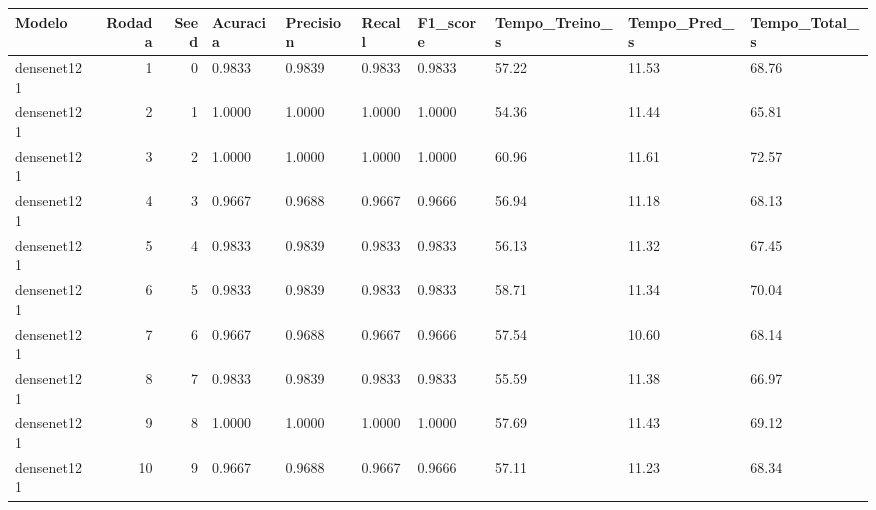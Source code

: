 \begin{tabular}{lrrlllllll}
\toprule
Modelo & Rodada & Seed & Acuracia & Precision & Recall & F1_score & Tempo_Treino_s & Tempo_Pred_s & Tempo_Total_s \\
\midrule
densenet121 & 1 & 0 & 0.9833 & 0.9839 & 0.9833 & 0.9833 & 57.22 & 11.53 & 68.76 \\
densenet121 & 2 & 1 & 1.0000 & 1.0000 & 1.0000 & 1.0000 & 54.36 & 11.44 & 65.81 \\
densenet121 & 3 & 2 & 1.0000 & 1.0000 & 1.0000 & 1.0000 & 60.96 & 11.61 & 72.57 \\
densenet121 & 4 & 3 & 0.9667 & 0.9688 & 0.9667 & 0.9666 & 56.94 & 11.18 & 68.13 \\
densenet121 & 5 & 4 & 0.9833 & 0.9839 & 0.9833 & 0.9833 & 56.13 & 11.32 & 67.45 \\
densenet121 & 6 & 5 & 0.9833 & 0.9839 & 0.9833 & 0.9833 & 58.71 & 11.34 & 70.04 \\
densenet121 & 7 & 6 & 0.9667 & 0.9688 & 0.9667 & 0.9666 & 57.54 & 10.60 & 68.14 \\
densenet121 & 8 & 7 & 0.9833 & 0.9839 & 0.9833 & 0.9833 & 55.59 & 11.38 & 66.97 \\
densenet121 & 9 & 8 & 1.0000 & 1.0000 & 1.0000 & 1.0000 & 57.69 & 11.43 & 69.12 \\
densenet121 & 10 & 9 & 0.9667 & 0.9688 & 0.9667 & 0.9666 & 57.11 & 11.23 & 68.34 \\
\bottomrule
\end{tabular}
